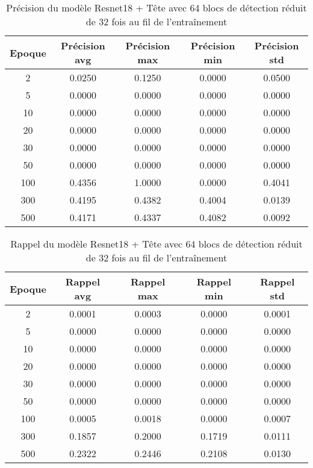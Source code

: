 \begin{table}[!ht]
    \caption{Précision du modèle Resnet18 + Tête avec 64 blocs de détection réduit de 32 fois au fil de l'entraînement}
    \label{tab:resnet18+head_64n_reduced_32x_precision}
    \centering
    \begin{tabular}{ |c||c|c|c|c|  }
        \hline
        \rowcolor{gray!50}
        Epoque & Précision avg & Précision max & Précision min & Précision std\\
        \hline
        2 & 0.0250 & 0.1250 & 0.0000 & 0.0500\\
        5 & 0.0000 & 0.0000 & 0.0000 & 0.0000\\
        10 & 0.0000 & 0.0000 & 0.0000 & 0.0000\\
        20 & 0.0000 & 0.0000 & 0.0000 & 0.0000\\
        30 & 0.0000 & 0.0000 & 0.0000 & 0.0000\\
        50 & 0.0000 & 0.0000 & 0.0000 & 0.0000\\
        100 & 0.4356 & 1.0000 & 0.0000 & 0.4041\\
        300 & 0.4195 & 0.4382 & 0.4004 & 0.0139\\
        500 & 0.4171 & 0.4337 & 0.4082 & 0.0092\\
        \hline
    \end{tabular}
\end{table}

\begin{table}[!ht]
    \caption{Rappel du modèle Resnet18 + Tête avec 64 blocs de détection réduit de 32 fois au fil de l'entraînement}
    \label{tab:resnet18+head_64n_reduced_32x_rappel}
    \centering
    \begin{tabular}{ |c||c|c|c|c|  }
        \hline
        \rowcolor{gray!50}
        Epoque & Rappel avg & Rappel max & Rappel min & Rappel std\\
        \hline
        2 & 0.0001 & 0.0003 & 0.0000 & 0.0001\\
        5 & 0.0000 & 0.0000 & 0.0000 & 0.0000\\
        10 & 0.0000 & 0.0000 & 0.0000 & 0.0000\\
        20 & 0.0000 & 0.0000 & 0.0000 & 0.0000\\
        30 & 0.0000 & 0.0000 & 0.0000 & 0.0000\\
        50 & 0.0000 & 0.0000 & 0.0000 & 0.0000\\
        100 & 0.0005 & 0.0018 & 0.0000 & 0.0007\\
        300 & 0.1857 & 0.2000 & 0.1719 & 0.0111\\
        500 & 0.2322 & 0.2446 & 0.2108 & 0.0130\\
        \hline
    \end{tabular}
\end{table}

